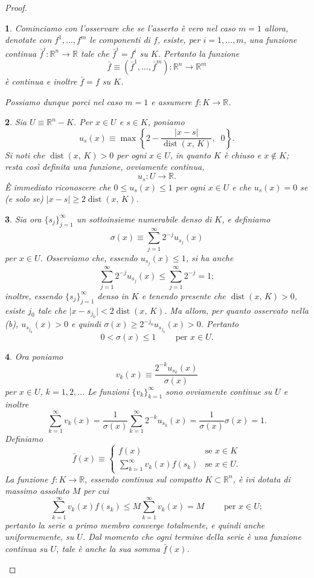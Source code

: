 \documentclass[a4paper,10pt,openright,oneside]{book}
\theoremstyle{theoremstyle}
\theoremstyle{theoremstylewoheader}
\theoremstyle{theoremstyle}
\theoremstyle{proofsecstyle}
\newtheorem{proofsec}{}
\theoremstyle{nonumberplain}
\newtheorem{proof}{Dim.}
\newcommand{\RR}{\ensuremath{\mathbb{R}}}
\newcommand{\abs}[1]{\ensuremath{\lvert #1 \rvert}}
\DeclareMathOperator{\dist}{dist}
\begin{document}
\begin{proof}
\begin{proofsec}
Cominciamo con l'osservare che se l'asserto è vero nel caso $m = 1$ allora, denotate con $f^1, \ldots, f^m$ le componenti di $f$, esiste, per $i = 1, \ldots, m$, una funzione continua $\bar{f}^i : \RR^n \rightarrow \RR$ tale che $\bar{f}^i = f^i$ su $K$. Pertanto la funzione
\[
\bar{f} \equiv (\bar{f}^1, \ldots, \bar{f}^m) : \RR^n \rightarrow \RR^m
\]
è continua e inoltre $\bar{f} = f$ su $K$.

Possiamo dunque porci nel caso $m = 1$ e assumere $f : K \rightarrow \RR$.
\end{proofsec}

\begin{proofsec}
Sia $U \equiv \RR^n - K$. Per $x \in U$ e $s \in K$, poniamo
\[
u_s(x) \equiv \max \left\{2 - \frac{\abs{x - s}}{\dist(x,\, K)},\;\; 0\right\}.
\]
Si noti che $\dist(x,\, K) > 0$ per ogni $x \in U$, in quanto $K$ è chiuso e $x \notin K$; resta così definita una funzione, ovviamente continua,
\[
u_s : U \rightarrow \RR.
\]
\`E immediato riconoscere che $0 \le u_s(x) \le 1$ per ogni $x \in U$ e che $u_s(x) = 0$ se (e solo se) $\abs{x - s} \ge 2\dist(x,\, K)$. 
\end{proofsec}

\begin{proofsec}
Sia ora $\{s_j\}_{j=1}^\infty$ un sottoinsieme numerabile denso di $K$, e definiamo
\[
\sigma(x) \equiv \sum_{j=1}^\infty 2^{-j} u_{s_j}(x)
\]
per $x \in U$. Osserviamo che, essendo $u_{s_j}(x) \le 1$, si ha anche
\[
\sum_{j=1}^\infty 2^{-j} u_{s_j}(x) \le \sum_{j=1}^\infty 2^{-j} = 1;
\]
inoltre, essendo $\{s_j\}_{j=1}^\infty$ denso in $K$ e tenendo presente che $\dist(x,\, K) > 0$, esiste $j_0$ tale che $\abs{x - s_{j_0}} < 2\dist(x,\, K)$. Ma allora, per quanto osservato nella (b), $u_{s_{j_0}} (x) > 0$ e quindi $\sigma(x) \ge 2^{-j_0}u_{s_{j_0}}(x) > 0$. Pertanto
\[
0 < \sigma(x) \le 1\qquad \text{ per $x \in U$}.
\]
\end{proofsec}

\begin{proofsec}
Ora poniamo
\[
v_k(x) \equiv \frac{2^{-k}u_{s_k}(x)}{\sigma(x)}
\]
per $x \in U$, $k = 1, 2, \ldots$ Le funzioni $\{v_k\}_{k=1}^\infty$ sono ovviamente continue su $U$ e inoltre
\[
\sum_{k=1}^\infty v_k(x) = \frac{1}{\sigma(x)} \sum_{k=1}^\infty 2^{-k} u_{s_k}(x) = \frac{1}{\sigma(x)} \sigma(x) = 1.
\]
Definiamo
\[
\bar{f}(x) \equiv \begin{cases}
f(x) & \text{se $x \in K$}\\
\sum_{k=1}^\infty v_k(x) f(s_k) & \text{se $x \in U$.}
\end{cases}
\]
La funzione $f : K \rightarrow \RR$, essendo continua sul compatto $K \subset \RR^n$, è ivi dotata di massimo assoluto $M$ per cui
\[
\sum_{k=1}^\infty v_k(x) f(s_k) \le M\sum_{k=1}^\infty v_k(x) = M\qquad\text{ per $x \in U$};
\]
pertanto la serie a primo membro converge totalmente, e quindi anche uniformemente, su $U$. Dal momento che ogni termine della serie è una funzione continua su $U$, tale è anche la sua somma $\bar{f}(x)$.
\end{proofsec}


\end{proof}
\end{document}
